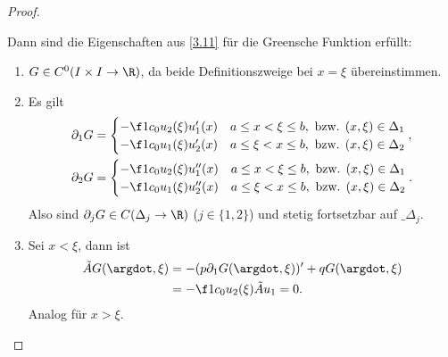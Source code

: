 \begin{st}
\begin{proof}
\begin{seg}[(ii)$\implies$(i)]
\begin{itemize}
					Dann sind die Eigenschaften aus \ref{3.11} für die Greensche Funktion erfüllt:
					\begin{enumerate}[1)]
						\item
							$G \in C^0(I \times I \to \R)$, da beide Definitionszweige bei $x = \xi$ übereinstimmen.
						\item
							Es gilt
							\begin{align*}
								\partial_1 G &= \begin{cases}
									-\f 1{c_0} u_2(\xi) u_1'(x) & a \le x < \xi \le b, \text{ bzw. $(x,\xi) \in \Delta_1$} \\
									-\f 1{c_0} u_1(\xi) u_2'(x) & a \le \xi < x \le b, \text{ bzw. $(x,\xi) \in \Delta_2$} 
								\end{cases}, \\
								\partial_2 G &= \begin{cases}
									-\f 1{c_0} u_2(\xi) u_1''(x) & a \le x < \xi \le b, \text{ bzw. $(x,\xi) \in \Delta_1$} \\
									-\f 1{c_0} u_1(\xi) u_2''(x) & a \le \xi < x \le b, \text{ bzw. $(x,\xi) \in \Delta_2$} 
								\end{cases}.
							\end{align*}
							Also sind $\partial_j G \in C(\Delta_j \to \R)$ ($j\in \{1,2\}$) und stetig fortsetzbar auf $\_{\Delta_j}$.
						\item
							Sei $x < \xi$, dann ist
							\begin{align*}
								\tilde A G(\argdot, \xi) 
								&= -(p\partial_1 G(\argdot, \xi))' + qG(\argdot, \xi)  \\
								&= - \f 1{c_0} u_2(\xi) \tilde A u_1 
								= 0.
							\end{align*}
							Analog für $x > \xi$.


\end{enumerate}
\end{itemize}
\end{seg}
\end{proof}
\end{st}
